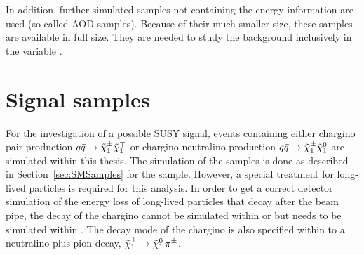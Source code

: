 In addition, further simulated samples not containing the energy information are used (so-called AOD samples).
Because of their much smaller size, these samples are available in full size.
They are needed to study the background inclusively in the variable \dedx.

\section{Signal samples}
\label{sec:SignalSamples}
For the investigation of a possible SUSY signal, events containing either chargino pair production $q\bar{q} \rightarrow \tilde{\chi}^{\pm}_{1} \tilde{\chi}^{\mp}_{1}$ or chargino neutralino production $q\bar{q} \rightarrow \tilde{\chi}^{\pm}_{1} \tilde{\chi}^{0}_{1}$ are simulated within this thesis. 
The simulation of the samples is done as described in Section~\ref{sec:SMSamples} for the \WJets sample.
However, a special treatment for long-lived particles is required for this analysis.
In order to get a correct detector simulation of the energy loss of long-lived particles that decay after the beam pipe, the decay of the chargino cannot be simulated within \madgraph or \pythia but needs to be simulated within \geant.
The decay mode of the chargino is also specified within \geant to a neutralino plus pion decay, $ \tilde{\chi}^{\pm}_{1} \rightarrow \tilde{\chi}^{0}_{1}\, \pi^{\pm}$.

